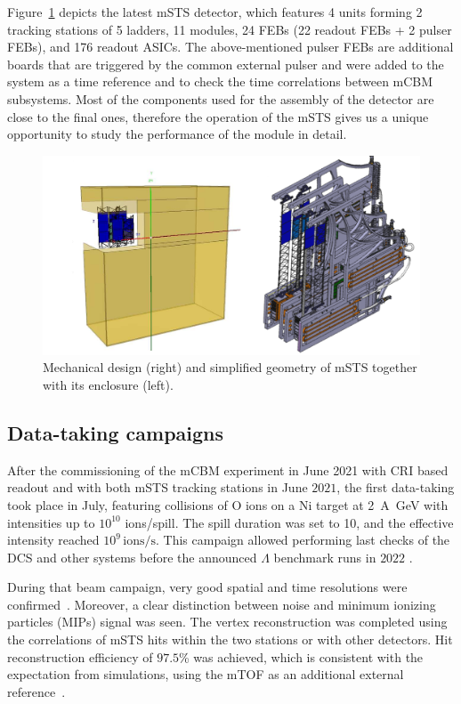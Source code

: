 Figure~\ref{fig_mSTS} depicts the latest \gls{mSTS} detector, which features \num{4} units forming \num{2} tracking stations of \num{5} ladders, \num{11} modules, \num{24} \glspl{FEB} (\num{22} readout \glspl{FEB} + \num{2} pulser \glspl{FEB}), and \num{176} readout \glspl{ASIC}. The above-mentioned pulser \glspl{FEB} are additional boards that are triggered by the common external pulser and were added to the system as a time reference and to check the time correlations between \gls{mCBM} subsystems.  Most of the components used for the assembly of the detector are close to the final ones, therefore the operation of the \gls{mSTS} gives us a unique opportunity to study the performance of the module in detail.
\begin{figure}[!h]
\centering
\includegraphics[width=0.75\columnwidth]{Chapter6/DCS/images/mSTS_mech.png}
\caption{Mechanical design (right) and simplified geometry of \gls{mSTS} together with its enclosure (left).}
\label{fig_mSTS}
\end{figure}
\newpage
\subsection{Data-taking campaigns}
After the commissioning of the \gls{mCBM} experiment in June \num{2021} with \gls{CRI} based readout and with both \gls{mSTS} tracking stations in June $2021$, the first data-taking took place in July, featuring collisions of O ions on a Ni target at \SI{2}{\A\giga\eV} with intensities up to $10^{10}$ ions/spill. The spill duration was set to \SI{10}{\sec}, and the effective intensity reached $10^{9}\,\mathrm{ions/s}$. This campaign allowed performing last checks of the \gls{DCS} and other systems before the announced $\Lambda$ benchmark runs in $2022$ \cite{sturm3}.

During that beam campaign, very good spatial and time resolutions were confirmed~\cite{dario1}. Moreover, a clear distinction between noise and minimum ionizing particles (\glspl{MIP}) signal was seen.
The vertex reconstruction was completed using the correlations of \gls{mSTS} hits within the two stations or with other detectors. Hit reconstruction efficiency of $97.5$\% was achieved, which is consistent with the expectation from simulations, using the mTOF as an additional external reference~\cite{dario1}.

